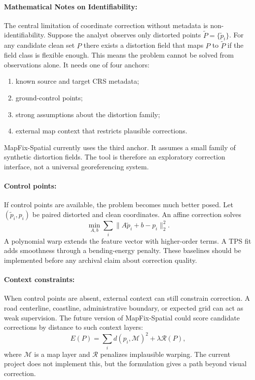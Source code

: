 \documentclass{article}
\begin{document}
\paragraph{Mathematical Notes on Identifiability:}

The central limitation of coordinate correction without metadata is non-identifiability. Suppose the analyst observes only distorted points $\tilde{P}=\{\tilde{p}_i\}$. For any candidate clean set $P$ there exists a distortion field that maps $P$ to $\tilde{P}$ if the field class is flexible enough. This means the problem cannot be solved from observations alone. It needs one of four anchors:
\begin{enumerate}
  \item known source and target CRS metadata;
  \item ground-control points;
  \item strong assumptions about the distortion family;
  \item external map context that restricts plausible corrections.
\end{enumerate}
MapFix-Spatial currently uses the third anchor. It assumes a small family of synthetic distortion fields. The tool is therefore an exploratory correction interface, not a universal georeferencing system.

\paragraph{Control points:}

If control points are available, the problem becomes much better posed. Let $(\tilde{p}_i,p_i)$ be paired distorted and clean coordinates. An affine correction solves
\begin{equation}
  \min_{A,b}\sum_i\|A\tilde{p}_i+b-p_i\|_2^2.
\end{equation}
A polynomial warp extends the feature vector with higher-order terms. A TPS fit adds smoothness through a bending-energy penalty. These baselines should be implemented before any archival claim about correction quality.

\paragraph{Context constraints:}

When control points are absent, external context can still constrain correction. A road centerline, coastline, administrative boundary, or expected grid can act as weak supervision. The future version of MapFix-Spatial could score candidate corrections by distance to such context layers:
\begin{equation}
  E(P)=\sum_i d(p_i,\mathcal{M})^2+\lambda\mathcal{R}(P),
\end{equation}
where $\mathcal{M}$ is a map layer and $\mathcal{R}$ penalizes implausible warping. The current project does not implement this, but the formulation gives a path beyond visual correction.
\end{document}
